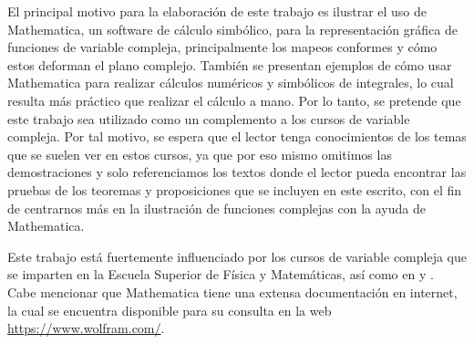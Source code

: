 \documentclass[letterpaper,12pt,openany]{book}
\theoremstyle{definition}
\theoremstyle{definition}
\theoremstyle{definition}
\theoremstyle{definition}
\theoremstyle{definition}
\theoremstyle{remark}
\theoremstyle{definition}
\begin{document}
	El principal motivo para la elaboración de este trabajo es ilustrar el uso de Mathematica, un software de cálculo simbólico, para la representación gráfica de funciones de variable compleja, principalmente los mapeos conformes y cómo estos deforman el plano complejo. También se presentan ejemplos de cómo usar Mathematica para realizar cálculos numéricos y simbólicos de integrales, lo cual resulta más práctico que realizar el cálculo a mano. Por lo tanto, se pretende que este trabajo sea utilizado como un complemento a los cursos de variable compleja. Por tal motivo, se espera que el lector tenga conocimientos de los temas que se suelen ver en estos cursos, ya que por eso mismo omitimos las demostraciones y solo referenciamos los textos donde el lector pueda encontrar las pruebas de los teoremas y proposiciones que se incluyen en este escrito, con el fin de centrarnos más en la ilustración de funciones complejas con la ayuda de Mathematica.
	
	Este trabajo está fuertemente influenciado por los cursos de variable compleja que se imparten en la Escuela Superior de Física y Matemáticas, así como en \cite{shaw} y \cite{silverman}. Cabe mencionar que Mathematica tiene una extensa documentación en internet, la cual se encuentra disponible para su consulta en la web \url{https://www.wolfram.com/}.
	\mainmatter
	
	
	
	
	
	
	
	
	
	
	
%	
	
	\nocite{tarlok}
	\nocite{silverman}
	\nocite{shaw}
	\nocite{ComplexRegionPlot}
	\nocite{marsden}
	\nocite{Churchill}
	\nocite{ahlfors}
	\nocite{rajeev}
	\nocite{Driscoll}
	\nocite{Abramowitz}
	\nocite{Beta}
	\nocite{BetaInc}
	\nocite{Pearson}
	\nocite{BetaR}
	\nocite{Conway}
	\nocite{Elliptic}
	\nocite{Hypergeometric2F1}
	\nocite{ComplexPlot}
	\nocite{ComplexPlot3D}
	\nocite{ComplexContourPlot}
	\nocite{Shaw-A}
	\nocite{GeometryJo}
	\nocite{ComplexVector}
	
\end{document}
